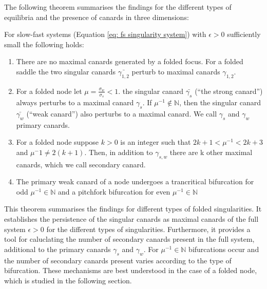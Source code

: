 The following theorem summarises the findings for the different types of equilibria and the presence of canards in three dimensions:
\begin{theorem}\label{thm: canards in R3}
	For slow-fast systems (Equation \ref{eq: fs singularity system}) with $ \epsilon>0 $ sufficiently small the following holds:
\begin{enumerate}
\item  There are no maximal canards generated by a folded focus. For a folded saddle the two singular canards $ \bar{\gamma_{1,2}} $ perturb to maximal canards $ \gamma_{1,2} $.
\item  For a folded node let $\mu=\frac{\sigma_w}{\sigma_s} <1$. the singular canard $ \bar{\gamma_{s}} $ (``the strong canard'') always perturbs to a maximal canard $ \gamma_{s} $. If $ \mu^{-1}\not \in \mathbb{N} $, then the singular canard $ \bar{\gamma_{w}} $ (``weak canard'') also perturbs to a maximal canard. We call $ \gamma_{s} $ and $ \gamma_{w} $ primary canards.
\item For a folded node suppose $ k>0 $ is an integer such that $ 2k+1<\mu^{-1} <2k+3$ and $ \mu^-1\neq 2(k+1) $. Then, in addition to $ \gamma_{s,w} $ there are k other maximal canards, which we call secondary canard.
\item The primary weak canard of a node undergoes a trancritical bifurcation for odd $ \mu^{-1}\in\mathbb{N} $ and a pitchfork bifurcation for even $ \mu^{-1}\in\mathbb{N} $
\end{enumerate}
\end{theorem}
This theorem summarises the findings for different types of folded singularities. It establishes the persistence of the singular canards as maximal canards of the full system $\epsilon >0$ for the different types of singularities. Furthermore, it provides a tool for caluclating the number of secondary canards present in the full system, additional to the primary canards $\gamma_s$ and $\gamma_w$.
For $ \mu^{-1}\in\mathbb{N} $ bifurcations occur and the number of secondary canards present varies according to the type of bifurcation.
These mechanisms are best understood in the case of a folded node, which is studied in the following section.


